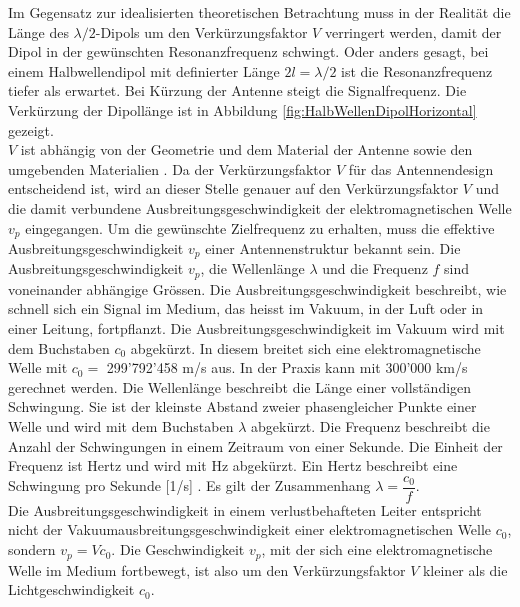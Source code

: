 Im Gegensatz zur idealisierten theoretischen Betrachtung muss in der Realität die Länge des $\lambda /2$-Dipols um den Verkürzungsfaktor $V$ verringert werden, damit der Dipol in der gewünschten Resonanzfrequenz schwingt. Oder anders gesagt, bei einem Halbwellendipol mit definierter Länge $2l=\lambda/2$ ist die Resonanzfrequenz tiefer als erwartet. Bei Kürzung der Antenne steigt die Signalfrequenz. Die Verkürzung der Dipollänge ist in Abbildung \ref{fig:HalbWellenDipolHorizontal} gezeigt. \\
$V$ ist abhängig von der Geometrie und dem Material der Antenne sowie den umgebenden Materialien \cite{Hcuno}. Da der Verkürzungsfaktor $V$ für das Antennendesign entscheidend ist,  wird an dieser Stelle genauer auf den Verkürzungsfaktor $V$ und die damit verbundene Ausbreitungsgeschwindigkeit der elektromagnetischen Welle $v_p$ eingegangen. Um die gewünschte Zielfrequenz zu erhalten, muss die effektive Ausbreitungsgeschwindigkeit $v_p$ einer Antennenstruktur bekannt sein. Die Ausbreitungsgeschwindigkeit $v_p$, die Wellenlänge $\lambda$ und die Frequenz $f$ sind voneinander abhängige Grössen. Die Ausbreitungsgeschwindigkeit beschreibt, wie schnell sich ein Signal im Medium, das heisst im Vakuum, in der Luft oder in einer Leitung, fortpflanzt. Die Ausbreitungsgeschwindigkeit im Vakuum wird mit dem Buchstaben $c_0$ abgekürzt. In diesem breitet sich eine elektromagnetische Welle mit $c_0 = $ 299'792’458 m/s aus. In der Praxis kann mit 300'000 km/s gerechnet werden. Die Wellenlänge beschreibt die Länge einer vollständigen Schwingung. Sie ist der kleinste Abstand zweier phasengleicher Punkte einer Welle und wird mit dem Buchstaben $\lambda$ abgekürzt. Die Frequenz beschreibt die Anzahl der Schwingungen in einem Zeitraum von einer Sekunde. Die Einheit der Frequenz ist Hertz und wird mit Hz abgekürzt. Ein Hertz beschreibt eine Schwingung pro Sekunde [1/s] \cite{Verkuertzungsfaktor}.
Es gilt der Zusammenhang $\lambda = \dfrac{c_0}{f}$. \\
Die Ausbreitungsgeschwindigkeit in einem verlustbehafteten Leiter entspricht nicht der Vakuumausbreitungsgeschwindigkeit einer elektromagnetischen Welle $c_0$, sondern $v_p=V c_0$. Die Geschwindigkeit $v_p$, mit der sich eine elektromagnetische Welle im Medium fortbewegt, ist also um den Verkürzungsfaktor $V$ kleiner als  die Lichtgeschwindigkeit $c_0$.\\ 


